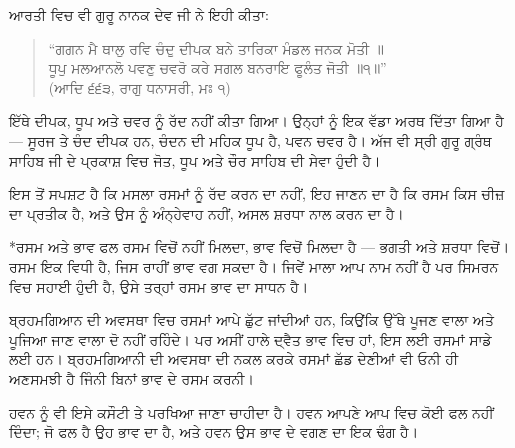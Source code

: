 \documentclass[12pt,a5paper,twoside]{book}  %
\makeatletter
\renewcommand\section{\@startsection{section}{1}{0pt}{1.2em}{0.6em}{\punjabifont\Large\bfseries}}%
\makeatother
\begin{document}
{ਆਰਤੀ ਵਿਚ ਵੀ ਗੁਰੂ ਨਾਨਕ ਦੇਵ ਜੀ ਨੇ ਇਹੀ ਕੀਤਾ:
\begin{quote}
“ਗਗਨ ਮੈ ਥਾਲੁ ਰਵਿ ਚੰਦੁ ਦੀਪਕ ਬਨੇ ਤਾਰਿਕਾ ਮੰਡਲ ਜਨਕ ਮੋਤੀ ॥ \\
ਧੂਪੁ ਮਲਆਨਲੋ ਪਵਣੁ ਚਵਰੋ ਕਰੇ ਸਗਲ ਬਨਰਾਇ ਫੂਲੰਤ ਜੋਤੀ ॥੧॥” \\
(ਆਦਿ ੬੬੩, ਰਾਗੁ ਧਨਾਸਰੀ, ਮਃ ੧)
\end{quote}
ਇੱਥੇ ਦੀਪਕ, ਧੂਪ ਅਤੇ ਚਵਰ ਨੂੰ ਰੱਦ ਨਹੀਂ ਕੀਤਾ ਗਿਆ। ਉਨ੍ਹਾਂ ਨੂੰ ਇਕ ਵੱਡਾ ਅਰਥ ਦਿੱਤਾ ਗਿਆ ਹੈ — ਸੂਰਜ ਤੇ ਚੰਦ ਦੀਪਕ ਹਨ, ਚੰਦਨ ਦੀ ਮਹਿਕ ਧੂਪ ਹੈ, ਪਵਨ ਚਵਰ ਹੈ। ਅੱਜ ਵੀ ਸ੍ਰੀ ਗੁਰੂ ਗ੍ਰੰਥ ਸਾਹਿਬ ਜੀ ਦੇ ਪ੍ਰਕਾਸ਼ ਵਿਚ ਜੋਤ, ਧੂਪ ਅਤੇ ਚੌਰ ਸਾਹਿਬ ਦੀ ਸੇਵਾ ਹੁੰਦੀ ਹੈ।

ਇਸ ਤੋਂ ਸਪਸ਼ਟ ਹੈ ਕਿ ਮਸਲਾ ਰਸਮਾਂ ਨੂੰ ਰੱਦ ਕਰਨ ਦਾ ਨਹੀਂ, ਇਹ ਜਾਣਨ ਦਾ ਹੈ ਕਿ ਰਸਮ ਕਿਸ ਚੀਜ਼ ਦਾ ਪ੍ਰਤੀਕ ਹੈ, ਅਤੇ ਉਸ ਨੂੰ ਅੰਨ੍ਹੇਵਾਹ ਨਹੀਂ, ਅਸਲ ਸ਼ਰਧਾ ਨਾਲ ਕਰਨ ਦਾ ਹੈ।

\section*{ਰਸਮ ਅਤੇ ਭਾਵ}
ਫਲ ਰਸਮ ਵਿਚੋਂ ਨਹੀਂ ਮਿਲਦਾ, ਭਾਵ ਵਿਚੋਂ ਮਿਲਦਾ ਹੈ — ਭਗਤੀ ਅਤੇ ਸ਼ਰਧਾ ਵਿਚੋਂ। ਰਸਮ ਇਕ ਵਿਧੀ ਹੈ, ਜਿਸ ਰਾਹੀਂ ਭਾਵ ਵਗ ਸਕਦਾ ਹੈ। ਜਿਵੇਂ ਮਾਲਾ ਆਪ ਨਾਮ ਨਹੀਂ ਹੈ ਪਰ ਸਿਮਰਨ ਵਿਚ ਸਹਾਈ ਹੁੰਦੀ ਹੈ, ਉਸੇ ਤਰ੍ਹਾਂ ਰਸਮ ਭਾਵ ਦਾ ਸਾਧਨ ਹੈ।

ਬ੍ਰਹਮਗਿਆਨ ਦੀ ਅਵਸਥਾ ਵਿਚ ਰਸਮਾਂ ਆਪੇ ਛੁੱਟ ਜਾਂਦੀਆਂ ਹਨ, ਕਿਉਂਕਿ ਉੱਥੇ ਪੂਜਣ ਵਾਲਾ ਅਤੇ ਪੂਜਿਆ ਜਾਣ ਵਾਲਾ ਦੋ ਨਹੀਂ ਰਹਿੰਦੇ। ਪਰ ਅਸੀਂ ਹਾਲੇ ਦ੍ਵੈਤ ਭਾਵ ਵਿਚ ਹਾਂ, ਇਸ ਲਈ ਰਸਮਾਂ ਸਾਡੇ ਲਈ ਹਨ। ਬ੍ਰਹਮਗਿਆਨੀ ਦੀ ਅਵਸਥਾ ਦੀ ਨਕਲ ਕਰਕੇ ਰਸਮਾਂ ਛੱਡ ਦੇਣੀਆਂ ਵੀ ਓਨੀ ਹੀ ਅਣਸਮਝੀ ਹੈ ਜਿੰਨੀ ਬਿਨਾਂ ਭਾਵ ਦੇ ਰਸਮ ਕਰਨੀ।

ਹਵਨ ਨੂੰ ਵੀ ਇਸੇ ਕਸੌਟੀ ਤੇ ਪਰਖਿਆ ਜਾਣਾ ਚਾਹੀਦਾ ਹੈ। ਹਵਨ ਆਪਣੇ ਆਪ ਵਿਚ ਕੋਈ ਫਲ ਨਹੀਂ ਦਿੰਦਾ; ਜੋ ਫਲ ਹੈ ਉਹ ਭਾਵ ਦਾ ਹੈ, ਅਤੇ ਹਵਨ ਉਸ ਭਾਵ ਦੇ ਵਗਣ ਦਾ ਇਕ ਢੰਗ ਹੈ।

}
\end{document}
